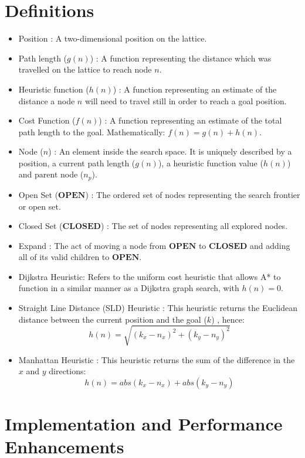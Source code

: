 \documentclass[conference]{IEEEtran}
\begin{document}
\section{Definitions}
\begin{itemize}
    \item Position : A two-dimensional position on the lattice.
    \item Path length ($g(n)$) : A function representing the distance which was travelled on the lattice to reach node $n$.
     \item Heuristic function ($h(n)$) : A function representing an estimate of the distance a node $n$ will need to travel still in order to reach a goal position.
     \item Cost Function ($f(n)$) : A function representing an estimate of the total path length to the goal. Mathematically: $f(n) = g(n) + h(n)$.
    \item Node ($n$) : An element inside the search space. It is uniquely described by a position, a current path length ($g(n)$), a heuristic function value ($h(n)$) and parent node ($n_p$).
    \item Open Set ($\mathbf{OPEN}$) : The ordered set of nodes representing the search frontier or open set.
    \item Closed Set ($\mathbf{CLOSED}$) : The set of nodes representing all explored nodes.
    \item Expand : The act of moving a node from $\mathbf{OPEN}$ to $\mathbf{CLOSED}$ and adding all of its valid children to $\mathbf{OPEN}$.
    \item Dijkstra Heuristic: Refers to the uniform cost heuristic that allows A* to function in a similar manner as a Dijkstra graph search, with $h(n) = 0$.
    \item Straight Line Distance (SLD) Heuristic : This heuristic returns the Euclidean distance between the current position and the goal ($k$) , hence: 
    \[h(n) = \sqrt{(k_x - n_x)^2 + (k_y - n_y)^2}\]
    \item Manhattan Heuristic : This heuristic returns the sum of the difference in the $x$ and $y$ directions:
    \[h(n) = abs(k_x - n_x) + abs(k_y - n_y) \]
\end{itemize}



\section{Implementation and Performance Enhancements}
\end{document}
